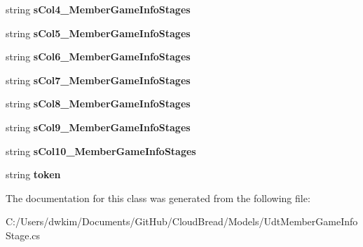 \begin{DoxyCompactItemize}
\item 
string {\bfseries s\+Col4\+\_\+\+Member\+Game\+Info\+Stages}\hypertarget{a00111_a289a2c1c05b9fd759f51ebe55aa88eea}{}\label{a00111_a289a2c1c05b9fd759f51ebe55aa88eea}

\item 
string {\bfseries s\+Col5\+\_\+\+Member\+Game\+Info\+Stages}\hypertarget{a00111_a85d0c05504c4ff09c6058a4bb4fe8616}{}\label{a00111_a85d0c05504c4ff09c6058a4bb4fe8616}

\item 
string {\bfseries s\+Col6\+\_\+\+Member\+Game\+Info\+Stages}\hypertarget{a00111_a12fe4339dcb1c61ccb75cce5858b7996}{}\label{a00111_a12fe4339dcb1c61ccb75cce5858b7996}

\item 
string {\bfseries s\+Col7\+\_\+\+Member\+Game\+Info\+Stages}\hypertarget{a00111_a6e27606f3c52d5f90afe78a4966891fc}{}\label{a00111_a6e27606f3c52d5f90afe78a4966891fc}

\item 
string {\bfseries s\+Col8\+\_\+\+Member\+Game\+Info\+Stages}\hypertarget{a00111_ab8a03338838017c4b4a0ec8c7d04b4fc}{}\label{a00111_ab8a03338838017c4b4a0ec8c7d04b4fc}

\item 
string {\bfseries s\+Col9\+\_\+\+Member\+Game\+Info\+Stages}\hypertarget{a00111_a57383ad47b0d964db6701a5baab2f32f}{}\label{a00111_a57383ad47b0d964db6701a5baab2f32f}

\item 
string {\bfseries s\+Col10\+\_\+\+Member\+Game\+Info\+Stages}\hypertarget{a00111_a570b2adba4dd7733a32ec72656d1259f}{}\label{a00111_a570b2adba4dd7733a32ec72656d1259f}

\item 
string {\bfseries token}\hypertarget{a00111_a9f1ae5ab5ea8cf30b20c57c5be81519a}{}\label{a00111_a9f1ae5ab5ea8cf30b20c57c5be81519a}

\end{DoxyCompactItemize}


The documentation for this class was generated from the following file\+:\begin{DoxyCompactItemize}
\item 
C\+:/\+Users/dwkim/\+Documents/\+Git\+Hub/\+Cloud\+Bread/\+Models/Udt\+Member\+Game\+Info\+Stage.\+cs\end{DoxyCompactItemize}
